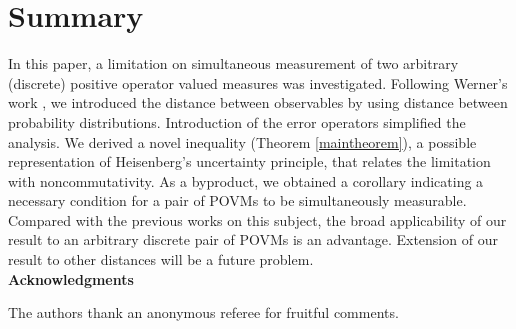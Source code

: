 \documentclass[12pt,showpacs,preprintnumbers,amsmath,amssymb]{revtex4-2}
\begin{document}
\section{Summary}
In this paper, 
a limitation on simultaneous 
measurement of two arbitrary (discrete) 
positive operator valued measures
was investigated. 
Following Werner's work \cite{Werner}, 
we introduced the distance between observables
 by using 
distance between probability distributions. 
Introduction of the error operators simplified
the analysis.
We derived a novel inequality (Theorem \ref{maintheorem}), a possible 
representation of Heisenberg's uncertainty 
principle, that relates the limitation with 
noncommutativity. 
As a byproduct, we obtained a 
corollary indicating a necessary condition for 
a pair of POVMs to be simultaneously measurable.
Compared with the previous works on this subject, 
the broad applicability of our result to an arbitrary
discrete pair of POVMs is an advantage.
Extension of our result to other distances will be a future problem. 
\\
{\bf Acknowledgments}
\par
The authors thank an anonymous referee for fruitful comments. 
\end{document}
